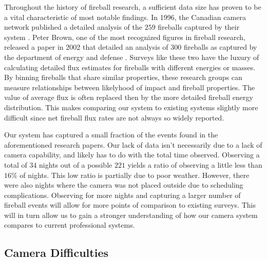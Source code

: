 Throughout the history of fireball research, a sufficient data size has proven to be a vital characteristic of most notable findings.
In 1996, the Canadian camera network published a detailed analysis of the $259$ fireballs captured by their system \cite{halliday_innisfree_1981}.
Peter Brown, one of the most recognized figures in fireball research, released a paper in 2002 that detailed an analysis of $300$ fireballs as captured by the department of energy and defense \cite{brown_p_flux_2002}.
Surveys like these two have the luxury of calculating detailed flux estimates for fireballs with different energies or masses.
By binning fireballs that share similar properties, these research groups can measure relationships between likelyhood of impact and fireball properties.
The value of average flux is often replaced then by the more detailed fireball energy distribution.
This makes comparing our system to existing systems slightly more difficult since net fireball flux rates are not always so widely reported.


Our system has captured a small fraction of the events found in the aforementioned research papers.
Our lack of data isn't necessarily due to a lack of camera capability, and likely has to do with the total time observed. 
Observing a total of $34$ nights out of a possible $221$ yields a ratio of observing a little less than $16\%$ of nights. 
This low ratio is partially due to poor weather.
However, there were also nights where the camera was not placed outside due to scheduling complications.
Observing for more nights and capturing a larger number of fireball events will allow for more points of comparison to existing surveys.
This will in turn allow us to gain a stronger understanding of how our camera system compares to current professional systems.


\subsection{Camera Difficulties}

